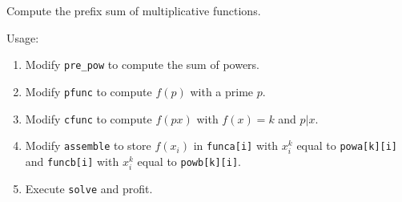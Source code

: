 Compute the prefix sum of multiplicative functions.

Usage:
\begin{enumerate}
	\item Modify \texttt{pre\_pow} to compute the sum of powers.
	\item Modify \texttt{pfunc} to compute $f(p)$ with a prime $p$.
	\item Modify \texttt{cfunc} to compute $f(px)$ with $f(x)=k$ and $p|x$.
	\item Modify \texttt{assemble} to store $f(x_i)$ in \texttt{funca[i]} with $x_i^k$ equal to \texttt{powa[k][i]} and \texttt{funcb[i]} with $x_i^k$ equal to \texttt{powb[k][i]}.
	\item Execute \texttt{solve} and profit.
\end{enumerate}



